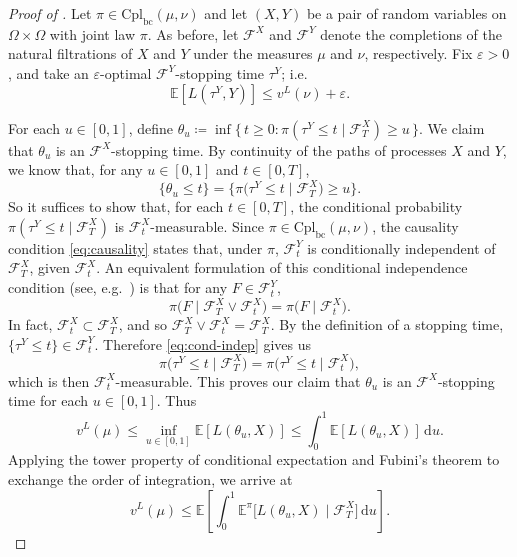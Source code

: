 \documentclass[onseside, final]{amsart}
\theoremstyle{definition}
\newcommand{\F}{\mathcal F}
\newcommand{\E}{\mathbb E}
\newcommand{\D}{\,\mathrm{d}}
\newcommand{\cpl}{\mathrm{Cpl}}
\newcommand{\cplba}{\cpl_{\mathrm{bc}}}
\numberwithin{equation}{section}
\begin{document}
		\begin{proof}[Proof of ]
			Let $\pi \in \cplba(\mu, \nu)$ and let $(X, Y)$ be a pair of random variables on $\Omega \times \Omega$ with joint law $\pi$. As before, let $\F^X$ and $\F^Y$ denote the completions of the natural filtrations of $X$ and $Y$ under the measures $\mu$ and $\nu$, respectively. Fix $\varepsilon > 0$, and take an $\varepsilon$-optimal $\F^Y$-stopping time $\tau^Y$; i.e.
			\begin{equation}\label{eq:os-suboptimal}
				\E[L(\tau^Y, Y)] \leq v^L(\nu) + \varepsilon.	
			\end{equation}

			
			For each $u \in [0, 1]$, define $\theta_u \coloneqq \inf\bigl\{\, t \geq 0 : \pi(\tau^Y \leq t \mid \F^X_T) \geq u \,\bigr\}$. We claim that $\theta_u$ is an $\F^X$-stopping time. By continuity of the paths of processes $X$ and $Y$, we know that, for any $u \in [0, 1]$ and $t \in [0, T]$,
			\begin{equation}
				\{\theta_u \leq t\} = \bigl\{\pi\bigl(\tau^Y \leq t \mid \F^X_T\bigr) \geq u\bigr\}.
			\end{equation}
			So it suffices to show that, for each $t \in [0, T]$, the conditional probability $\pi(\tau^Y \leq t \mid \F^X_T)$ is $\F^X_t$-measurable. Since $\pi \in \cplba(\mu, \nu)$, the causality condition \eqref{eq:causality} states that, under $\pi$, $\F^Y_t$ is conditionally independent of $\F^X_T$, given $\F^X_t$. An equivalent formulation of this conditional independence condition (see, e.g.~\citet[Theorem 8.9]{Ka21}) is that for any $F \in \F^Y_t$,
			\begin{equation}\label{eq:cond-indep}
				\pi\bigl(F \mid \F^X_T \vee \F^X_t\bigr) = \pi\bigl(F \mid \F^X_t\bigr).
			\end{equation}
			In fact, $\F^X_t \subset \F^X_T$, and so $\F^X_T \vee \F^X_t = \F^X_T$. By the definition of a stopping time, $\{\tau^Y \leq t\} \in \F^Y_t$. Therefore \eqref{eq:cond-indep} gives us
			\begin{equation}
				\pi\bigl(\tau^Y \leq t \mid \F^X_T\bigr) = \pi\bigl(\tau^Y \leq t \mid \F^X_t\bigr),
			\end{equation}
			which is then $\F^X_t$-measurable. This proves our claim that $\theta_u$ is an $\F^X$-stopping time for each $u \in [0, 1]$. Thus
			\begin{equation}
				v^L(\mu) \leq \inf_{u \in [0, 1]}\E[L(\theta_u, X)] \leq \int_0^1 \E[L(\theta_u, X)] \D u.
			\end{equation}
			Applying the tower property of conditional expectation and Fubini's theorem to exchange the order of integration, we arrive at
			\begin{equation}\label{eq:os-upper-bound}
				v^L(\mu) \leq \E \!\left[\int_0^1 \E^\pi\bigl[L(\theta_u, X) \mid \F^X_T\bigr] \D u\right]\!.
			\end{equation}
			

\end{proof}
\end{document}
